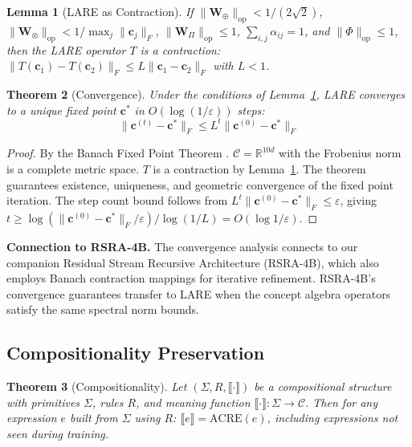 \documentclass{article}
\newtheorem{theorem}{Theorem}
\newtheorem{lemma}[theorem]{Lemma}
\newcommand{\R}{\mathbb{R}}
\newcommand{\cC}{\mathcal{C}}
\newcommand{\bW}{\mathbf{W}}
\newcommand{\bc}{\mathbf{c}}
\begin{document}
\begin{lemma}[LARE as Contraction]\label{lem:contraction}
If $\|\bW_\oplus\|_{\mathrm{op}} < 1/(2\sqrt{2})$, $\|\bW_\otimes\|_{\mathrm{op}} < 1/\max_j \|\bc_j\|_F$, $\|\bW_\Pi\|_{\mathrm{op}} \leq 1$, $\sum_{i,j} \alpha_{ij} = 1$, and $\|\Phi\|_{\mathrm{op}} \leq 1$, then the LARE operator $T$ is a contraction: $\|T(\bc_1) - T(\bc_2)\|_F \leq L \|\bc_1 - \bc_2\|_F$ with $L < 1$.
\end{lemma}

\begin{theorem}[Convergence]\label{thm:convergence}
Under the conditions of Lemma~\ref{lem:contraction}, LARE converges to a unique fixed point $\bc^*$ in $O(\log(1/\varepsilon))$ steps:
\begin{equation}
\|\bc^{(t)} - \bc^*\|_F \leq L^t \|\bc^{(0)} - \bc^*\|_F
\end{equation}
\end{theorem}

\begin{proof}
By the Banach Fixed Point Theorem \citep{banach1922operations}. $\cC = \R^{10d}$ with the Frobenius norm is a complete metric space. $T$ is a contraction by Lemma~\ref{lem:contraction}. The theorem guarantees existence, uniqueness, and geometric convergence of the fixed point iteration. The step count bound follows from $L^t \|\bc^{(0)} - \bc^*\|_F \leq \varepsilon$, giving $t \geq \log(\|\bc^{(0)} - \bc^*\|_F / \varepsilon) / \log(1/L) = O(\log 1/\varepsilon)$.
\end{proof}

\textbf{Connection to RSRA-4B.} The convergence analysis connects to our companion Residual Stream Recursive Architecture (RSRA-4B), which also employs Banach contraction mappings for iterative refinement. RSRA-4B's convergence guarantees transfer to LARE when the concept algebra operators satisfy the same spectral norm bounds.

\subsection{Compositionality Preservation}

\begin{theorem}[Compositionality]\label{thm:compositionality}
Let $(\Sigma, R, \llbracket \cdot \rrbracket)$ be a compositional structure with primitives $\Sigma$, rules $R$, and meaning function $\llbracket \cdot \rrbracket : \Sigma \to \cC$. Then for any expression $e$ built from $\Sigma$ using $R$: $\llbracket e \rrbracket = \mathrm{ACRE}(e)$, including expressions not seen during training.
\end{theorem}
\end{document}
